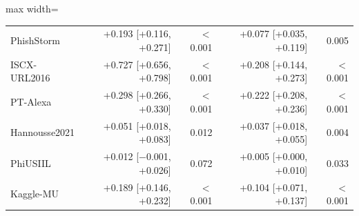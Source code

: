 \begin{table}[tp]
\begin{adjustbox}{max width=\linewidth}
\begin{tabular}{@{}lrrrr@{}}
\quad PhishStorm & +0.193 [+0.116, +0.271] & $<$0.001 & +0.077 [+0.035, +0.119] & 0.005 \\
\quad ISCX-URL2016 & +0.727 [+0.656, +0.798] & $<$0.001 & +0.208 [+0.144, +0.273] & $<$0.001 \\
\quad PT-Alexa & +0.298 [+0.266, +0.330] & $<$0.001 & +0.222 [+0.208, +0.236] & $<$0.001 \\
\quad Hannousse2021 & +0.051 [+0.018, +0.083] & 0.012 & +0.037 [+0.018, +0.055] & 0.004 \\
\quad PhiUSIIL & +0.012 [$-$0.001, +0.026] & 0.072 & +0.005 [+0.000, +0.010] & 0.033 \\
\quad Kaggle-MU & +0.189 [+0.146, +0.232] & $<$0.001 & +0.104 [+0.071, +0.137] & $<$0.001 \\
\bottomrule
\end{tabular}
\end{adjustbox}
\end{table}
